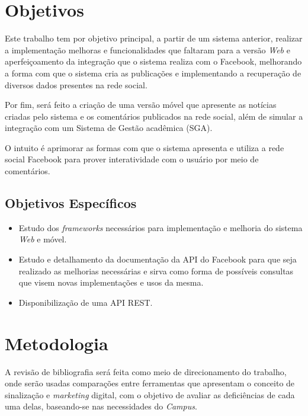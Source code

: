 \section{Objetivos}
Este trabalho tem por objetivo principal, a partir de um sistema anterior, realizar a implementação melhoras e funcionalidades que faltaram para a versão \textit{Web} e  aperfeiçoamento da integração que o sistema realiza com o Facebook, melhorando a forma com que o sistema cria as publicações e implementando a recuperação de diversos dados presentes na rede social.

Por fim, será feito a criação de uma versão móvel que apresente as notícias criadas pelo sistema e os comentários publicados na rede social, além de simular a integração com um Sistema de Gestão acadêmica (SGA).


O intuito é aprimorar as formas com que o sistema apresenta e utiliza a rede social Facebook para prover interatividade com o usuário por meio de comentários.

\subsection{Objetivos Específicos}
	 \begin{itemize}
	\item Estudo dos \textit{frameworks} necessários para implementação e melhoria do sistema \textit{Web} e móvel.
	
	\item Estudo e detalhamento da documentação da API do Facebook para que seja realizado as melhorias necessárias e sirva como forma de possíveis consultas que visem novas implementações e usos da mesma.
	 	
	\item Disponibilização de uma API REST.
	\end{itemize}
	
\section{Metodologia}
A revisão de bibliografia será feita como meio de direcionamento do trabalho, onde serão usadas comparações entre ferramentas que apresentam o conceito de sinalização e \textit{marketing} digital, com o objetivo de avaliar as deficiências de cada uma delas, baseando-se nas necessidades do \textit{Campus}.

